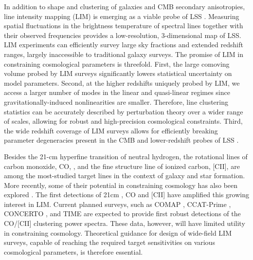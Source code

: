 \documentclass[twocolumn]{aastex631}
\begin{document}
In addition to shape and clustering of galaxies and CMB secondary anisotropies, line intensity mapping (LIM) is emerging as a viable probe of LSS \citep{Kovetz:2017agg}. Measuring spatial fluctuations in the brightness temperature of spectral lines together with their observed frequencies provides a low-resolution, 3-dimensional map of LSS.  LIM experiments can efficiently survey large sky fractions and extended redshift ranges, largely inaccessible to traditional galaxy surveys. The promise of LIM in constraining cosmological parameters is threefold. First, the large comoving volume probed by LIM surveys significantly lowers statistical uncertainty on model parameters. Second, at the higher redshifts uniquely probed by LIM, we access a larger number of modes in the linear and quasi-linear regimes since gravitationally-induced nonlinearities are smaller. Therefore, line clustering statistics can be accurately described by perturbation theory over a wider range of scales, allowing for robust and high-precision cosmological constraints. Third, the wide redshift coverage of LIM surveys allows for efficiently breaking parameter degeneracies present in the CMB and lower-redshift probes of LSS \citep{Archidiacono:2016lnv,Obuljen:2017jiy,Lorenz:2017fgo,Sprenger:2018tdb}.

Besides the 21-cm hyperfine transition of neutral hydrogen, the rotational lines of carbon monoxide, CO, \citep{Righi:2008br,Lidz:2011dx,Breysse:2014uia,Li:2015gqa,Fonseca:2016qqw,Padmanabhan:2017ate}, and the fine structure line of ionized carbon, [CII], \citep{Gong:2011ts,Silva:2014ira,Fonseca:2016qqw,Pullen:2017ogs,Padmanabhan:2018yul} are among the most-studied target lines in the context of galaxy and star formation. More recently, some of their potential in constraining cosmology has also been explored \citep{Karkare:2018sar,Creque-Sarbinowski:2018ebl,MoradinezhadDizgah:2018zrs,MoradinezhadDizgah:2018lac,Liu:2020izx,Gong:2020lim,Bernal:2020lkd,Bernal:2021ylz}. The first detections of 21cm \citep{Masui:2012zc}, CO \citep{Keating:2015qva,Keating:2016pka,Keating:2020wlx} and [CII] \citep{Pullen:2017ogs} have amplified this growing interest in LIM. Current planned surveys, such as COMAP \citep{Li:2015gqa}, CCAT-Prime \citep{Aravena:2019tye}, CONCERTO \citep{Lagache_2018}, and TIME \citep{doi:10.1117/12.2057207} are expected to provide first robust detections of the CO/[CII] clustering power spectra. These data, however, will have limited utility in constraining cosmology. Theoretical guidance for design of wide-field LIM surveys, capable of reaching the required target sensitivities on various cosmological parameters, is therefore essential. 
\end{document}
